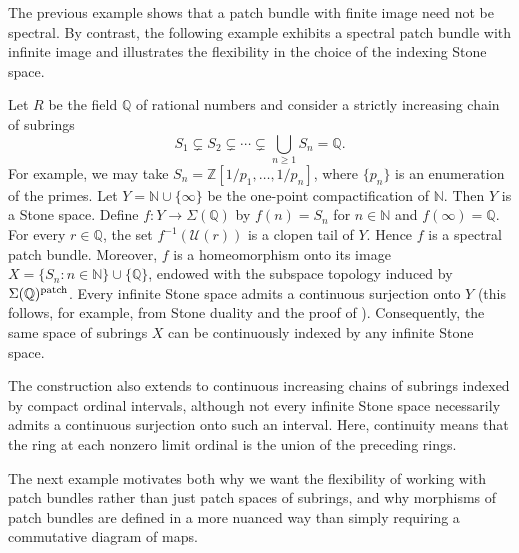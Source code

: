 \documentclass[11pt]{amsart}
\begin{document}
The previous example shows that a patch bundle with finite image need not be spectral. By contrast, the following example exhibits a spectral patch bundle with infinite image and illustrates the flexibility in the choice of the indexing Stone space.

\begin{example} \label{chain 1}
Let $R$ be the field ${\mathbb{Q}}$ of rational numbers and consider a strictly increasing
chain of subrings
\[
S_1\subsetneq S_2\subsetneq\cdots
\subsetneq\bigcup_{n\geq 1}S_n=\mathbb Q.
\]
For example, we may take $S_n=\mathbb Z[1/p_1,\ldots,1/p_n]$, where $\{p_n\}$ is an enumeration of the primes. Let $Y= {\mathbb{N}} \cup \{\infty\}$ be the one-point compactification of ${\mathbb{N}}$. Then $Y$ is a Stone space. Define $f:Y\to\Sigma(\mathbb Q)$ by $f(n)=S_n$ for $n\in\mathbb N$ and $f(\infty)=\mathbb Q$. For every $r\in\mathbb Q$, the set $f^{-1}(\mathcal U(r))$ is a clopen tail of $Y$. Hence $f$ is a spectral patch bundle. Moreover, $f$ is a homeomorphism onto its image
$X=\{S_n:n\in\mathbb N\}\cup\{\mathbb Q\}$, endowed with the subspace topology induced by
$\Sigma(\mathbb Q)^{\rm patch}$. Every infinite Stone space admits a continuous
surjection onto $Y$ (this follows, for example, from Stone duality and the proof of
\cite[Lemma~4.2]{BH}). Consequently, the same space of subrings $X$ can be continuously indexed by any infinite Stone space.

The construction also extends to continuous increasing chains of subrings indexed by compact ordinal intervals, although not every infinite Stone space necessarily admits a continuous surjection onto such an interval. Here, continuity means that the ring at each nonzero limit ordinal is the union of the preceding rings.
\end{example}

The next example motivates both why we want the flexibility of working with patch bundles rather than just patch spaces of subrings, and why morphisms of patch bundles are defined in a more nuanced way than simply requiring a commutative diagram of maps.  
\end{document}
